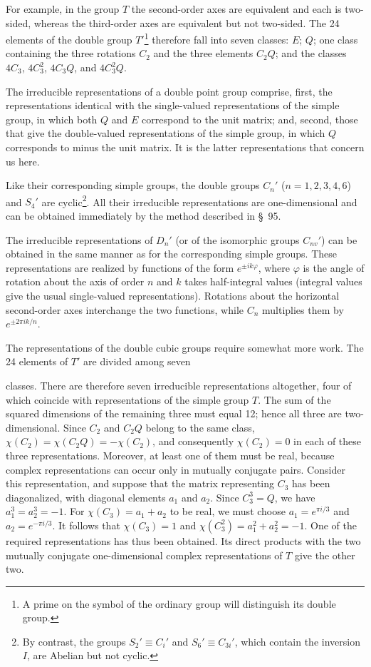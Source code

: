 For example, in the group $T$ the second-order axes are equivalent and each is two-sided, whereas the third-order axes are equivalent but not two-sided. The 24 elements of the double group $T'$\footnote{A prime on the symbol of the ordinary group will distinguish its double group.} therefore fall into seven classes: $E$; $Q$; one class containing the three rotations $C_2$ and the three elements $C_2Q$; and the classes $4C_3$, $4C_3^2$, $4C_3Q$, and $4C_3^2Q$.

The irreducible representations of a double point group comprise, first, the representations identical with the single-valued representations of the simple group, in which both $Q$ and $E$ correspond to the unit matrix; and, second, those that give the double-valued representations of the simple group, in which $Q$ corresponds to minus the unit matrix. It is the latter representations that concern us here.

Like their corresponding simple groups, the double groups $C_n'$ ($n=1,2,3,4,6$) and $S_4'$ are cyclic\footnote{By contrast, the groups $S_2'\equiv C_i'$ and $S_6'\equiv C_{3i}'$, which contain the inversion $I$, are Abelian but not cyclic.}. All their irreducible representations are one-dimensional and can be obtained immediately by the method described in \S~95.

The irreducible representations of $D_n'$ (or of the isomorphic groups $C_{nv}'$) can be obtained in the same manner as for the corresponding simple groups. These representations are realized by functions of the form $e^{\pm ik\varphi}$, where $\varphi$ is the angle of rotation about the axis of order $n$ and $k$ takes half-integral values (integral values give the usual single-valued representations). Rotations about the horizontal second-order axes interchange the two functions, while $C_n$ multiplies them by $e^{\pm2\pi ik/n}$.

The representations of the double cubic groups require somewhat more work. The 24 elements of $T'$ are divided among seven

classes. There are therefore seven irreducible representations altogether, four of which coincide with representations of the simple group $T$. The sum of the squared dimensions of the remaining three must equal 12; hence all three are two-dimensional. Since $C_2$ and $C_2Q$ belong to the same class, $\chi(C_2)=\chi(C_2Q)=-\chi(C_2)$, and consequently $\chi(C_2)=0$ in each of these three representations. Moreover, at least one of them must be real, because complex representations can occur only in mutually conjugate pairs. Consider this representation, and suppose that the matrix representing $C_3$ has been diagonalized, with diagonal elements $a_1$ and $a_2$. Since $C_3^3=Q$, we have $a_1^3=a_2^3=-1$. For $\chi(C_3)=a_1+a_2$ to be real, we must choose $a_1=e^{\pi i/3}$ and $a_2=e^{-\pi i/3}$. It follows that $\chi(C_3)=1$ and $\chi(C_3^2)=a_1^2+a_2^2=-1$. One of the required representations has thus been obtained. Its direct products with the two mutually conjugate one-dimensional complex representations of $T$ give the other two.

